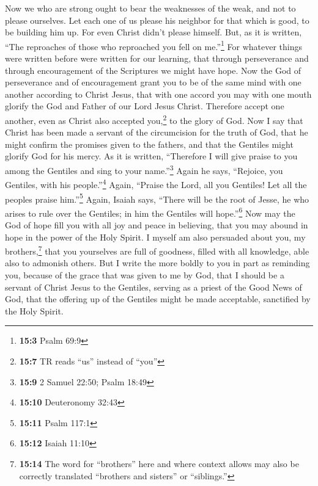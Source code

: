  Now we who are strong ought to bear the weaknesses of the
weak, and not to please ourselves.  Let each one of us
please his neighbor for that which is good, to be building him up.
 For even Christ didn't please himself. But, as it is
written, ``The reproaches of those who reproached you fell on
me.''\footnote{\textbf{15:3} Psalm 69:9}  For whatever
things were written before were written for our learning, that through
perseverance and through encouragement of the Scriptures we might have
hope.  Now the God of perseverance and of encouragement
grant you to be of the same mind with one another according to Christ
Jesus,  that with one accord you may with one mouth
glorify the God and Father of our Lord Jesus Christ. 
Therefore accept one another, even as Christ also accepted
you,\footnote{\textbf{15:7} TR reads ``us'' instead of ``you''} to the
glory of God.  Now I say that Christ has been made a
servant of the circumcision for the truth of God, that he might confirm
the promises given to the fathers,  and that the Gentiles
might glorify God for his mercy. As it is written, ``Therefore I will
give praise to you among the Gentiles and sing to your
name.''\footnote{\textbf{15:9} 2 Samuel 22:50; Psalm 18:49}
 Again he says, ``Rejoice, you Gentiles, with his
people.''\footnote{\textbf{15:10} Deuteronomy 32:43} 
Again, ``Praise the Lord, all you Gentiles! Let all the peoples praise
him.''\footnote{\textbf{15:11} Psalm 117:1}  Again,
Isaiah says, ``There will be the root of Jesse, he who arises to rule
over the Gentiles; in him the Gentiles will hope.''\footnote{\textbf{15:12}
  Isaiah 11:10}  Now may the God of hope fill you with
all joy and peace in believing, that you may abound in hope in the power
of the Holy Spirit.  I myself am also persuaded about
you, my brothers,\footnote{\textbf{15:14} The word for ``brothers'' here
  and where context allows may also be correctly translated ``brothers
  and sisters'' or ``siblings.''} that you yourselves are full of
goodness, filled with all knowledge, able also to admonish others.
 But I write the more boldly to you in part as reminding
you, because of the grace that was given to me by God, 
that I should be a servant of Christ Jesus to the Gentiles, serving as a
priest of the Good News of God, that the offering up of the Gentiles
might be made acceptable, sanctified by the Holy Spirit. 
